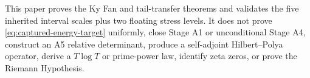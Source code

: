 \documentclass[11pt]{article}
\theoremstyle{remark}
\begin{document}
This paper proves the Ky Fan and tail-transfer theorems and validates the
five inherited interval scales plus two floating stress levels.  It does not
prove \eqref{eq:captured-energy-target} uniformly, close Stage A1 or
unconditional Stage A4, construct an A5 relative determinant, produce a
self-adjoint Hilbert--Polya operator, derive a $T\log T$ or prime-power law,
identify zeta zeros, or prove the Riemann Hypothesis.



\end{document}
